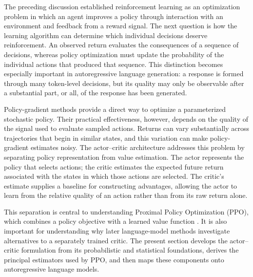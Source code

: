 
The preceding discussion established reinforcement learning as an optimization
problem in which an agent improves a policy through interaction with an
environment and feedback from a reward signal. The next question is how the
learning algorithm can determine which individual decisions deserve
reinforcement. An observed return evaluates the consequences of a sequence of
decisions, whereas policy optimization must update the probability of the
individual actions that produced that sequence. This distinction becomes
especially important in autoregressive language generation: a response is
formed through many token-level decisions, but its quality may only be
observable after a substantial part, or all, of the response has been
generated.

Policy-gradient methods provide a direct way to optimize a parameterized
stochastic policy. Their practical effectiveness, however, depends on the
quality of the signal used to evaluate sampled actions. Returns can vary
substantially across trajectories that begin in similar states, and this
variation can make policy-gradient estimates noisy. The actor--critic
architecture addresses this problem by separating policy representation from
value estimation. The actor represents the policy that selects actions; the
critic estimates the expected future return associated with the states in
which those actions are selected. The critic's estimate supplies a baseline
for constructing advantages, allowing the actor to learn from the relative
quality of an action rather than from its raw return alone.

This separation is central to understanding Proximal Policy Optimization
(PPO), which combines a policy objective with a learned value function
\parencite{schulman2017ppo}. It is also important for understanding why later
language-model methods investigate alternatives to a separately trained
critic. The present section develops the actor--critic formulation from its
probabilistic and statistical foundations, derives the principal estimators
used by PPO, and then maps these components onto autoregressive language
models.

